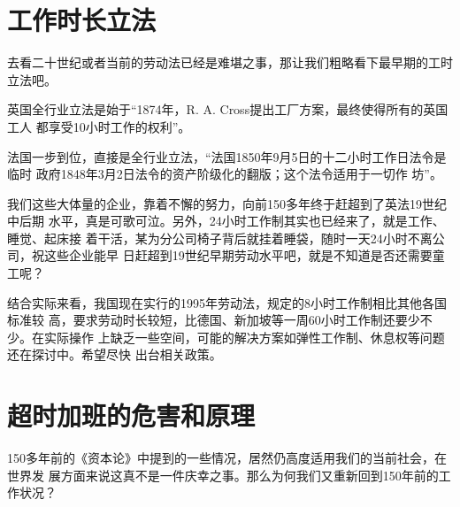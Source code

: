 \section{工作时长立法}

去看二十世纪或者当前的劳动法已经是难堪之事，那让我们粗略看下最早期的工时立法吧。

英国全行业立法是始于“1874年，R. A. Cross提出工厂方案，最终使得所有的英国工人
都享受10小时工作的权利”。

法国一步到位，直接是全行业立法，“法国1850年9月5日的十二小时工作日法令是临时
政府1848年3月2日法令的资产阶级化的翻版；这个法令适用于一切作
坊”。

我们这些大体量的企业，靠着不懈的努力，向前150多年终于赶超到了英法19世纪中后期
水平，真是可歌可泣。另外，24小时工作制其实也已经来了，就是工作、睡觉、起床接
着干活，某为分公司椅子背后就挂着睡袋，随时一天24小时不离公司，祝这些企业能早
日赶超到19世纪早期劳动水平吧，就是不知道是否还需要童工呢？

结合实际来看，我国现在实行的1995年劳动法，规定的8小时工作制相比其他各国标准较
高，要求劳动时长较短，比德国、新加坡等一周60小时工作制还要少不少。在实际操作
上缺乏一些空间，可能的解决方案如弹性工作制、休息权等问题还在探讨中。希望尽快
出台相关政策。

\section{超时加班的危害和原理}
\label{sec:gzryuanli}

150多年前的《资本论》中提到的一些情况，居然仍高度适用我们的当前社会，在世界发
展方面来说这真不是一件庆幸之事。那么为何我们又重新回到150年前的工作状况？

